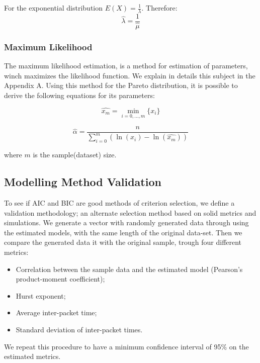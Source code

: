 For the exponential distribution $E(X) = \frac{1}{\lambda}$. Therefore:
\begin{equation}
\hat{\lambda} = \frac{1}{\hat{\mu}}
\end{equation} 

\subsubsection{Maximum Likelihood}


The maximum likelihood estimation, is a method for estimation of parameters, winch maximizes the likelihood function. We explain in details this subject in the Appendix A. Using this method for the Pareto distribution, it is possible to derive the following equations for its parameters:

\begin{equation}
\hat{x_{m}} = \min_{i = 0, ..., m}\{x_{i}\}
\end{equation} 

\begin{equation}
\hat{\alpha} = \frac{n}{ \sum_{i = 0}^{m}(\ln{(x_{i}) - \ln(\hat{x_{m}})})  }
\end{equation} 

where $m$ is the sample(dataset) size.


\subsection{Modelling Method Validation}

To see if AIC and BIC are good methods of criterion selection, we define a validation methodology; an alternate selection method based on solid metrics and simulations. We generate a vector with randomly generated data through using the estimated models, with the same length of the original data-set. Then we compare the generated data it with the original sample, trough four different metrics:

\begin{itemize}
\item Correlation between the sample data and the estimated model (Pearson's product-moment coefficient);
\item Hurst exponent;
\item Average inter-packet time;
\item Standard deviation of inter-packet times.
\end{itemize}
We repeat this procedure to have a minimum confidence interval of 95\% on the estimated metrics. 

